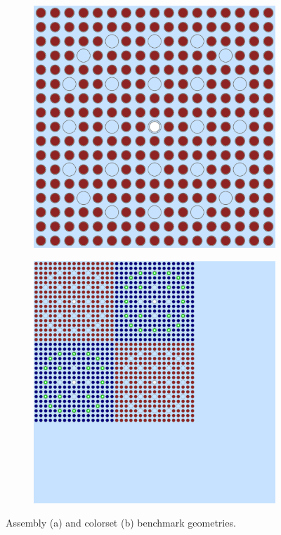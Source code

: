 \begin{figure}[h!]
\centering
\begin{subfigure}{0.45\textwidth}
  \centering
  \includegraphics[width=0.8\linewidth]{figures/assembly/geometry}
  \caption{}
  \label{fig:benchmarks}
\end{subfigure}
\begin{subfigure}{0.45\textwidth}
  \centering
  \includegraphics[width=0.8\linewidth]{figures/colorset/geometry}
  \caption{}
  \label{fig:benchmarks-colorset}
\end{subfigure}
\caption{Assembly (a) and colorset (b) benchmark geometries.}
\label{fig:benchmarks-materials}
\end{figure}

